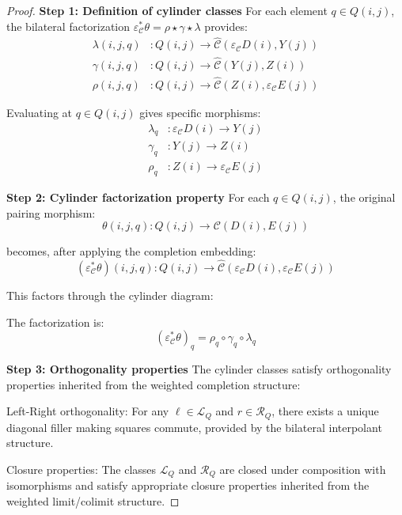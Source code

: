 \documentclass[11pt]{article}
\theoremstyle{plain}
\theoremstyle{definition}
\theoremstyle{remark}
\newcommand{\C}{\mathcal{C}}
\newcommand{\wh}[1]{\widehat{#1}}
\begin{document}
\begin{proof}
\textbf{Step 1: Definition of cylinder classes}
For each element $q \in Q(i, j)$, the bilateral factorization $\varepsilon_\C^* \theta = \rho \star \gamma \star \lambda$ provides:
\begin{align}
\lambda(i, j, q) &: Q(i, j) \to \wh{\C}(\varepsilon_\C D(i), Y(j)) \\
\gamma(i, j, q) &: Q(i, j) \to \wh{\C}(Y(j), Z(i)) \\
\rho(i, j, q) &: Q(i, j) \to \wh{\C}(Z(i), \varepsilon_\C E(j))
\end{align}

Evaluating at $q \in Q(i, j)$ gives specific morphisms:
\begin{align}
\lambda_q &: \varepsilon_\C D(i) \to Y(j) \\
\gamma_q &: Y(j) \to Z(i) \\
\rho_q &: Z(i) \to \varepsilon_\C E(j)
\end{align}

\textbf{Step 2: Cylinder factorization property}
For each $q \in Q(i, j)$, the original pairing morphism:
$$\theta(i, j, q) : Q(i, j) \to \C(D(i), E(j))$$

becomes, after applying the completion embedding:
$$(\varepsilon_\C^* \theta)(i, j, q) : Q(i, j) \to \wh{\C}(\varepsilon_\C D(i), \varepsilon_\C E(j))$$

This factors through the cylinder diagram:
\begin{center}
\end{center}

The factorization is:
$$(\varepsilon_\C^* \theta)_q = \rho_q \circ \gamma_q \circ \lambda_q$$

\textbf{Step 3: Orthogonality properties}
The cylinder classes satisfy orthogonality properties inherited from the weighted completion structure:

Left-Right orthogonality: For any $\ell \in \mathcal{L}_Q$ and $r \in \mathcal{R}_Q$, there exists a unique diagonal filler making squares commute, provided by the bilateral interpolant structure.

Closure properties: The classes $\mathcal{L}_Q$ and $\mathcal{R}_Q$ are closed under composition with isomorphisms and satisfy appropriate closure properties inherited from the weighted limit/colimit structure.


\end{proof}
\end{document}
